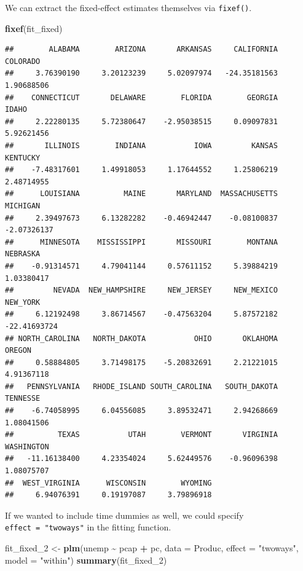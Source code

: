 \documentclass[
  12pt,
  oneside,openany]{book}
\newenvironment{Shaded}{\begin{snugshade}}{\end{snugshade}}
\newcommand{\DataTypeTok}[1]{\textcolor[rgb]{0.13,0.29,0.53}{#1}}
\newcommand{\DecValTok}[1]{\textcolor[rgb]{0.00,0.00,0.81}{#1}}
\newcommand{\KeywordTok}[1]{\textcolor[rgb]{0.13,0.29,0.53}{\textbf{#1}}}
\newcommand{\NormalTok}[1]{#1}
\newcommand{\OperatorTok}[1]{\textcolor[rgb]{0.81,0.36,0.00}{\textbf{#1}}}
\newcommand{\StringTok}[1]{\textcolor[rgb]{0.31,0.60,0.02}{#1}}
\begin{document}
We can extract the fixed-effect estimates themselves via \texttt{fixef()}.

\begin{Shaded}
\begin{Highlighting}[]
\KeywordTok{fixef}\NormalTok{(fit\_fixed)}
\end{Highlighting}
\end{Shaded}

\begin{verbatim}
##        ALABAMA        ARIZONA       ARKANSAS     CALIFORNIA       COLORADO 
##     3.76390190     3.20123239     5.02097974   -24.35181563     1.90688506 
##    CONNECTICUT       DELAWARE        FLORIDA        GEORGIA          IDAHO 
##     2.22280135     5.72380647    -2.95038515     0.09097831     5.92621456 
##       ILLINOIS        INDIANA           IOWA         KANSAS       KENTUCKY 
##    -7.48317601     1.49918053     1.17644552     1.25806219     2.48714955 
##      LOUISIANA          MAINE       MARYLAND  MASSACHUSETTS       MICHIGAN 
##     2.39497673     6.13282282    -0.46942447    -0.08100837    -2.07326137 
##      MINNESOTA    MISSISSIPPI       MISSOURI        MONTANA       NEBRASKA 
##    -0.91314571     4.79041144     0.57611152     5.39884219     1.03380417 
##         NEVADA  NEW_HAMPSHIRE     NEW_JERSEY     NEW_MEXICO       NEW_YORK 
##     6.12192498     3.86714567    -0.47563204     5.87572182   -22.41693724 
## NORTH_CAROLINA   NORTH_DAKOTA           OHIO       OKLAHOMA         OREGON 
##     0.58884805     3.71498175    -5.20832691     2.21221015     4.91367118 
##   PENNSYLVANIA   RHODE_ISLAND SOUTH_CAROLINA   SOUTH_DAKOTA       TENNESSE 
##    -6.74058995     6.04556085     3.89532471     2.94268669     1.08041506 
##          TEXAS           UTAH        VERMONT       VIRGINIA     WASHINGTON 
##   -11.16138400     4.23354024     5.62449576    -0.96096398     1.08075707 
##  WEST_VIRGINIA      WISCONSIN        WYOMING 
##     6.94076391     0.19197087     3.79896918
\end{verbatim}

If we wanted to include time dummies as well, we could specify \texttt{effect\ =\ "twoways"} in the fitting function.

\begin{Shaded}
\begin{Highlighting}[]
\NormalTok{fit\_fixed\_}\DecValTok{2}\NormalTok{ <{-}}\StringTok{ }\KeywordTok{plm}\NormalTok{(unemp }\OperatorTok{\textasciitilde{}}\StringTok{ }\NormalTok{pcap }\OperatorTok{+}\StringTok{ }\NormalTok{pc,}
                   \DataTypeTok{data =}\NormalTok{ Produc,}
                   \DataTypeTok{effect =} \StringTok{"twoways"}\NormalTok{,}
                   \DataTypeTok{model =} \StringTok{"within"}\NormalTok{)}
\KeywordTok{summary}\NormalTok{(fit\_fixed\_}\DecValTok{2}\NormalTok{)}
\end{Highlighting}
\end{Shaded}
\end{document}
